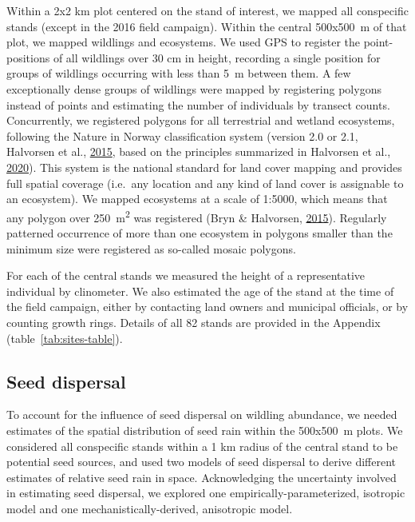 \documentclass[
]{article}
\begin{document}
Within a 2x2 km plot centered on the stand of interest, we mapped all conspecific stands (except in the 2016 field campaign).
Within the central 500x500~m of that plot, we mapped wildlings and ecosystems.
We used GPS to register the point-positions of all wildlings over 30 cm in height, recording a single position for groups of wildlings occurring with less than 5~m between them.
A few exceptionally dense groups of wildlings were mapped by registering polygons instead of points and estimating the number of individuals by transect counts.
Concurrently, we registered polygons for all terrestrial and wetland ecosystems, following the Nature in Norway classification system (version 2.0 or 2.1, Halvorsen et al., \protect\hyperlink{ref-halvorsenNaturNorgeNiN2015}{2015}, based on the principles summarized in Halvorsen et al., \protect\hyperlink{ref-halvorsenSystematicsEcodiversityEcoSyst2020}{2020}).
This system is the national standard for land cover mapping and provides full spatial coverage (i.e.~any location and any kind of land cover is assignable to an ecosystem).
We mapped ecosystems at a scale of 1:5000, which means that any polygon over 250~m\textsuperscript{2} was registered (Bryn \& Halvorsen, \protect\hyperlink{ref-brynVeilederKartleggingAv2015}{2015}).
Regularly patterned occurrence of more than one ecosystem in polygons smaller than the minimum size were registered as so-called mosaic polygons.

For each of the central stands we measured the height of a representative individual by clinometer.
We also estimated the age of the stand at the time of the field campaign, either by contacting land owners and municipal officials, or by counting growth rings.
Details of all 82 stands are provided in the Appendix (table~\ref{tab:sites-table}).

\hypertarget{seed-dispersal}{%
\subsection{Seed dispersal}\label{seed-dispersal}}

To account for the influence of seed dispersal on wildling abundance, we needed estimates of the spatial distribution of seed rain within the 500x500~m plots.
We considered all conspecific stands within a 1 km radius of the central stand to be potential seed sources, and used two models of seed dispersal to derive different estimates of relative seed rain in space.
Acknowledging the uncertainty involved in estimating seed dispersal, we explored one empirically-parameterized, isotropic model and one mechanistically-derived, anisotropic model.
\end{document}
